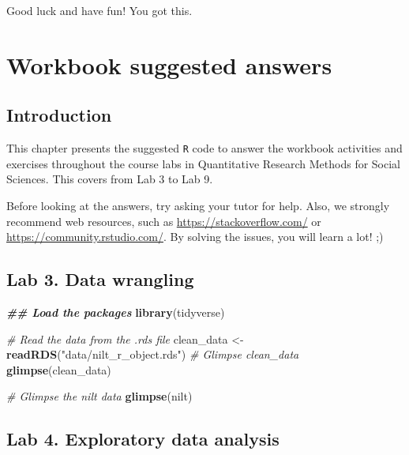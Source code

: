\documentclass[
]{book}
\newenvironment{Shaded}{\begin{snugshade}}{\end{snugshade}}
\newcommand{\CommentTok}[1]{\textcolor[rgb]{0.56,0.35,0.01}{\textit{#1}}}
\newcommand{\DocumentationTok}[1]{\textcolor[rgb]{0.56,0.35,0.01}{\textbf{\textit{#1}}}}
\newcommand{\FunctionTok}[1]{\textcolor[rgb]{0.13,0.29,0.53}{\textbf{#1}}}
\newcommand{\NormalTok}[1]{#1}
\newcommand{\OtherTok}[1]{\textcolor[rgb]{0.56,0.35,0.01}{#1}}
\newcommand{\StringTok}[1]{\textcolor[rgb]{0.31,0.60,0.02}{#1}}
\begin{document}
Good luck and have fun! You got this.

\hypertarget{answers}{%
\chapter*{Workbook suggested answers}\label{answers}}

\hypertarget{introduction-4}{%
\section{Introduction}\label{introduction-4}}

This chapter presents the suggested \texttt{R} code to answer the workbook activities and exercises throughout the course labs in Quantitative Research Methods for Social Sciences. This covers from Lab 3 to Lab 9.

Before looking at the answers, try asking your tutor for help. Also, we strongly recommend web resources, such as \url{https://stackoverflow.com/} or \url{https://community.rstudio.com/}. By solving the issues, you will learn a lot! ;)

\hypertarget{lab-3.-data-wrangling}{%
\section{Lab 3. Data wrangling}\label{lab-3.-data-wrangling}}

\begin{Shaded}
\begin{Highlighting}[]
\DocumentationTok{\#\# Load the packages}
\FunctionTok{library}\NormalTok{(tidyverse)}

\CommentTok{\# Read the data from the .rds file}
\NormalTok{clean\_data }\OtherTok{\textless{}{-}} \FunctionTok{readRDS}\NormalTok{(}\StringTok{"data/nilt\_r\_object.rds"}\NormalTok{)}
\CommentTok{\# Glimpse clean\_data}
\FunctionTok{glimpse}\NormalTok{(clean\_data)}

\CommentTok{\# Glimpse the nilt data}
\FunctionTok{glimpse}\NormalTok{(nilt)}
\end{Highlighting}
\end{Shaded}

\hypertarget{lab-4.-exploratory-data-analysis}{%
\section{Lab 4. Exploratory data analysis}\label{lab-4.-exploratory-data-analysis}}
\end{document}
